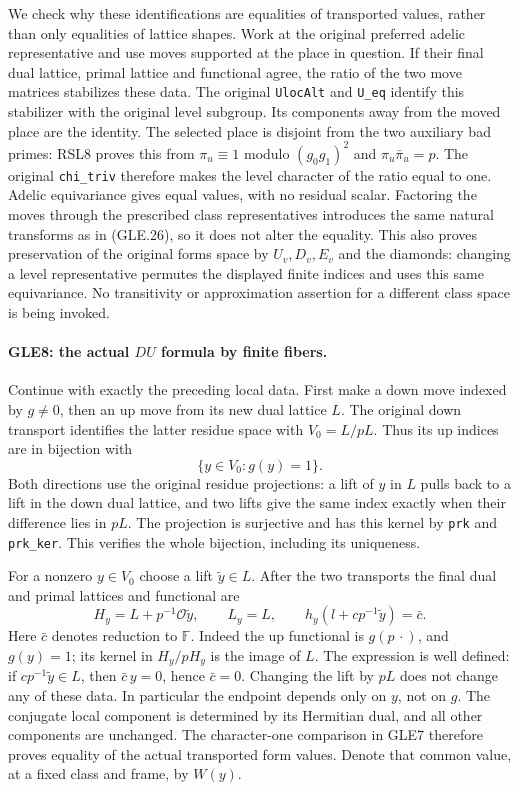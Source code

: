 We check why these identifications are equalities of transported
values, rather than only equalities of lattice shapes.  Work at the
original preferred adelic representative and use moves supported at
the place in question.  If their final dual lattice, primal lattice
and functional agree, the ratio of the two move matrices stabilizes
these data.  The original \texttt{UlocAlt} and \texttt{U\_eq}
identify this stabilizer with the original level subgroup.  Its
components away from the moved place are the identity.  The selected
place is disjoint from the two auxiliary bad primes: RSL8 proves this
from $\pi_u\equiv1$ modulo $(g_0g_1)^2$ and
$\pi_u\bar\pi_u=p$.  The original \texttt{chi\_triv} therefore
makes the level character of the ratio equal to one.  Adelic
equivariance gives equal values, with no residual scalar.
Factoring the moves through the prescribed class representatives
introduces the same natural transforms as in (GLE.26), so it does
not alter the equality.  This also proves preservation of the
original forms space by $U_v,D_v,E_v$ and the diamonds: changing a
level representative permutes the displayed finite indices and
uses this same equivariance.  No transitivity or approximation
assertion for a different class space is being invoked.

\paragraph{GLE8: the actual $DU$ formula by finite fibers.}
\label{claim:GLE8}
Continue with exactly the preceding local data.  First make a down
move indexed by $g\ne0$, then an up move from its new dual lattice
$L$.  The original down transport identifies the latter residue
space with $V_0=L/pL$.  Thus its up indices are in bijection with
\[
                         \{y\in V_0:g(y)=1\}.                  \tag{GLE.32}
\]
Both directions use the original residue projections: a lift of $y$
in $L$ pulls back to a lift in the down dual lattice, and two lifts
give the same index exactly when their difference lies in $pL$.
The projection is surjective and has this kernel by \texttt{prk}
and \texttt{prk\_ker}.  This verifies the whole bijection, including
its uniqueness.

For a nonzero $y\in V_0$ choose a lift $\widetilde y\in L$.
After the two transports the final dual and primal lattices and
functional are
\[
 H_y=L+p^{-1}\mathcal O\widetilde y,\qquad L_y=L,
 \qquad h_y(l+c p^{-1}\widetilde y)=\bar c.                    \tag{GLE.33}
\]
Here $\bar c$ denotes reduction to $\mathbb F$.
Indeed the up functional is $g(p\,\cdot)$, and $g(y)=1$;
its kernel in $H_y/pH_y$ is the image of $L$.
The expression is well defined: if $c p^{-1}\widetilde y\in L$,
then $\bar c\,y=0$, hence $\bar c=0$.
Changing the lift by $pL$ does not change any of these data.
In particular the endpoint depends only on $y$, not on $g$.
The conjugate local component is determined by its Hermitian dual,
and all other components are unchanged.  The character-one
comparison in GLE7 therefore proves equality of the actual
transported form values.  Denote that common value, at a fixed class
and frame, by $W(y)$.

